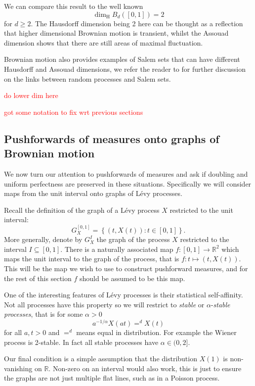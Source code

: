 We can compare this result to the well known \[\dim_{\mathrm{H}} B_d([0,1])=2\] for $d\geq 2$. The Hausdorff dimension being 2 here can be thought as a reflection that higher dimensional Brownian motion is transient, whilst the Assouad dimension shows that there are still areas of maximal fluctuation. 

Brownian motion also provides examples of Salem sets that can have different Hausdorff and Assouad dimensions, we refer the reader to \cite{Ka}  for further discussion on the links between random processes and Salem sets.




\textcolor{red}{do lower dim here}


\textcolor{red}{got some notation to fix wrt previous sections}
\subsection{Pushforwards of measures onto graphs of Brownian motion}


We now turn our attention to pushforwards of measures and ask if doubling and uniform perfectness are preserved in these situations. Specifically we will consider maps from the unit interval onto graphs of L\'evy processes.


Recall the definition of the graph of a L\'evy process $X$ restricted to the unit interval:
\[
G_X^{[0,1]} = \left\{ (t,X(t)) \colon t \in [0,1] \right\}.
\]
More generally, denote by $G_X^I$ the graph of the process $X$ restricted to the interval $I \subseteq [0,1]$. There is a naturally associated map $f: [0,1] \rightarrow \mathbb{R}^2$ which maps the unit interval to the graph of the process, that is $f\colon t \mapsto (t,X(t))$. This will be the map we wish to use to construct pushforward measures, and for the rest of this section $f$ should be assumed to be this map. 

One of the interesting features of L\'evy processes is their statistical self-affinity. Not all processes have this property so we will restrict to \textit{stable} or $\alpha$-\textit{stable processes}, that is for some $\alpha > 0$
\[
a^{-1/\alpha}X(at) =^d X(t)
\]
for all $a,t > 0$ and $=^d$ means equal in distribution. For example the Wiener process is 2-stable. In fact all stable processes have $\alpha \in (0,2]$. 

Our final condition is a simple assumption that the distribution $X(1)$ is non-vanishing on $\mathbb{R}$. Non-zero on an interval would also work, this is just to ensure the graphs are not just multiple flat lines, such as in a Poisson process.


